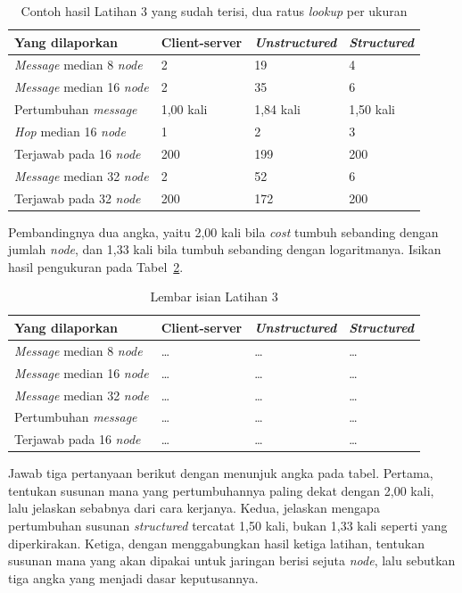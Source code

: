 \begin{table}[htbp]
  \centering
  \caption{Contoh hasil Latihan 3 yang sudah terisi, dua ratus \textit{lookup} per
    ukuran}
  \label{tab:lat3p2p-contoh}
  \begin{tabularx}{\textwidth}{|X|l|l|l|}
    \hline
    \textbf{Yang dilaporkan} & \textbf{Client-server} & \textbf{\textit{Unstructured}} & \textbf{\textit{Structured}} \\
    \hline
    \textit{Message} median 8 \textit{node} & 2 & 19 & 4 \\
    \hline
    \textit{Message} median 16 \textit{node} & 2 & 35 & 6 \\
    \hline
    Pertumbuhan \textit{message} & 1,00 kali & 1,84 kali & 1,50 kali \\
    \hline
    \textit{Hop} median 16 \textit{node} & 1 & 2 & 3 \\
    \hline
    Terjawab pada 16 \textit{node} & 200 & 199 & 200 \\
    \hline
    \textit{Message} median 32 \textit{node} & 2 & 52 & 6 \\
    \hline
    Terjawab pada 32 \textit{node} & 200 & 172 & 200 \\
    \hline
  \end{tabularx}
\end{table}

Pembandingnya dua angka, yaitu 2,00 kali bila \textit{cost} tumbuh sebanding dengan
jumlah \textit{node}, dan 1,33 kali bila tumbuh sebanding dengan logaritmanya. Isikan
hasil pengukuran pada Tabel~\ref{tab:lat3p2p-hasil}.

\begin{table}[htbp]
  \centering
  \caption{Lembar isian Latihan 3}
  \label{tab:lat3p2p-hasil}
  \begin{tabularx}{\textwidth}{|X|l|l|l|}
    \hline
    \textbf{Yang dilaporkan} & \textbf{Client-server} & \textbf{\textit{Unstructured}} & \textbf{\textit{Structured}} \\
    \hline
    \textit{Message} median 8 \textit{node} & \dots & \dots & \dots \\
    \hline
    \textit{Message} median 16 \textit{node} & \dots & \dots & \dots \\
    \hline
    \textit{Message} median 32 \textit{node} & \dots & \dots & \dots \\
    \hline
    Pertumbuhan \textit{message} & \dots & \dots & \dots \\
    \hline
    Terjawab pada 16 \textit{node} & \dots & \dots & \dots \\
    \hline
  \end{tabularx}
\end{table}

Jawab tiga pertanyaan berikut dengan menunjuk angka pada tabel. Pertama,
tentukan susunan mana yang pertumbuhannya paling dekat dengan 2,00 kali, lalu
jelaskan sebabnya dari cara kerjanya. Kedua, jelaskan mengapa pertumbuhan
susunan \textit{structured} tercatat 1,50 kali, bukan 1,33 kali seperti yang
diperkirakan. Ketiga, dengan menggabungkan hasil ketiga latihan, tentukan
susunan mana yang akan dipakai untuk jaringan berisi sejuta \textit{node}, lalu
sebutkan tiga angka yang menjadi dasar keputusannya.
